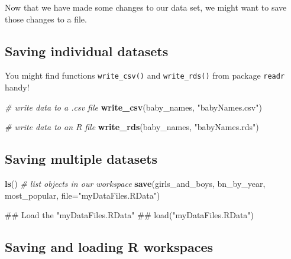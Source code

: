 \documentclass[]{book}
\newenvironment{Shaded}{\begin{snugshade}}{\end{snugshade}}
\newcommand{\KeywordTok}[1]{\textcolor[rgb]{0.13,0.29,0.53}{\textbf{#1}}}
\newcommand{\DataTypeTok}[1]{\textcolor[rgb]{0.13,0.29,0.53}{#1}}
\newcommand{\StringTok}[1]{\textcolor[rgb]{0.31,0.60,0.02}{#1}}
\newcommand{\CommentTok}[1]{\textcolor[rgb]{0.56,0.35,0.01}{\textit{#1}}}
\newcommand{\NormalTok}[1]{#1}
\begin{document}
Now that we have made some changes to our data set, we might want to
save those changes to a file.

\subsection{Saving individual
datasets}\label{saving-individual-datasets}

You might find functions \texttt{write\_csv()} and \texttt{write\_rds()}
from package \texttt{readr} handy!

\begin{Shaded}
\begin{Highlighting}[]
\CommentTok{# write data to a .csv file}
\KeywordTok{write_csv}\NormalTok{(baby_names, }\StringTok{"babyNames.csv"}\NormalTok{)}
\end{Highlighting}
\end{Shaded}

\begin{Shaded}
\begin{Highlighting}[]
\CommentTok{# write data to an R file}
\KeywordTok{write_rds}\NormalTok{(baby_names, }\StringTok{"babyNames.rds"}\NormalTok{)}
\end{Highlighting}
\end{Shaded}

\subsection{Saving multiple datasets}\label{saving-multiple-datasets}

\begin{Shaded}
\begin{Highlighting}[]
\KeywordTok{ls}\NormalTok{() }\CommentTok{# list objects in our workspace}
\KeywordTok{save}\NormalTok{(girls_and_boys, bn_by_year, most_popular, }\DataTypeTok{file=}\StringTok{"myDataFiles.RData"}\NormalTok{)  }
\end{Highlighting}
\end{Shaded}

\begin{Shaded}
\begin{Highlighting}[]
\NormalTok{## Load the "myDataFiles.RData"}
\NormalTok{## load("myDataFiles.RData") }
\end{Highlighting}
\end{Shaded}

\subsection{Saving and loading R
workspaces}\label{saving-and-loading-r-workspaces}
\end{document}
